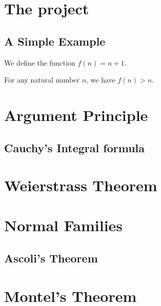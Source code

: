 %

\chapter{The project}

\section{A Simple Example}

\begin{definition}
\label{def:my_definition}
\leanok
We define the function \( f(n) = n + 1 \).
\end{definition}

\begin{lemma}
\label{lem:my_lemma}
\leanok
{}
For any natural number \( n \), we have \( f(n) > n \).
\end{lemma}

\chapter{Argument Principle}

\section{Cauchy's Integral formula}

\chapter{Weierstrass Theorem}

\chapter{Normal Families}

\section{Ascoli's Theorem}

\chapter{Montel's Theorem}